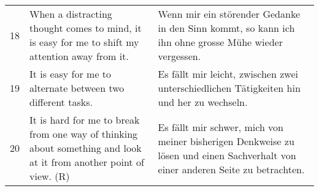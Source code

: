 \begin{center}
\begin{longtable}[t]{|l|p{6.6 cm}|p{6.6 cm}|}
        18 & When a distracting thought comes to mind, it is easy for me to shift my attention away from it. & Wenn mir ein störender Gedanke in den Sinn kommt, so kann ich ihn ohne grosse Mühe wieder vergessen.  \\
        19 & It is easy for me to alternate between two different tasks. & Es fällt mir leicht, zwischen zwei unterschiedlichen Tätigkeiten hin und her zu wechseln. \\
        20 & It is hard for me to break from one way of thinking about something and look at it from another point of view. (R) & Es fällt mir schwer, mich von meiner bisherigen Denkweise zu lösen und einen Sachverhalt von einer anderen Seite zu betrachten. \\ \hline
    \end{longtable}
	\label{tab:AcsUebersetzung}
\end{center}

